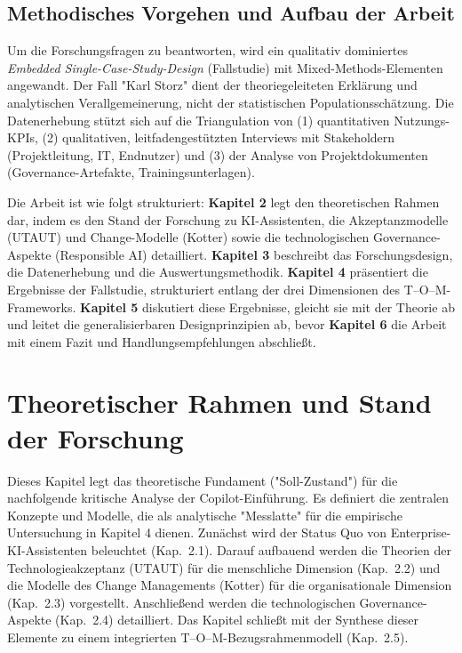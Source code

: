 \documentclass[12pt,a4paper,oneside]{article} %
\begin{document}
\subsection{Methodisches Vorgehen und Aufbau der Arbeit}
Um die Forschungsfragen zu beantworten, wird ein qualitativ dominiertes \textit{Embedded Single-Case-Study-Design} (Fallstudie) mit Mixed-Methods-Elementen angewandt. Der Fall "Karl Storz" dient der theoriegeleiteten Erklärung und analytischen Verallgemeinerung, nicht der statistischen Populationsschätzung. Die Datenerhebung stützt sich auf die Triangulation von (1) quantitativen Nutzungs-KPIs, (2) qualitativen, leitfadengestützten Interviews mit Stakeholdern (Projektleitung, IT, Endnutzer) und (3) der Analyse von Projektdokumenten (Governance-Artefakte, Trainingsunterlagen).

Die Arbeit ist wie folgt strukturiert: \textbf{Kapitel 2} legt den theoretischen Rahmen dar, indem es den Stand der Forschung zu KI-Assistenten, die Akzeptanzmodelle (UTAUT) und Change-Modelle (Kotter) sowie die technologischen Governance-Aspekte (Responsible AI) detailliert. \textbf{Kapitel 3} beschreibt das Forschungsdesign, die Datenerhebung und die Auswertungsmethodik. \textbf{Kapitel 4} präsentiert die Ergebnisse der Fallstudie, strukturiert entlang der drei Dimensionen des T–O–M-Frameworks. \textbf{Kapitel 5} diskutiert diese Ergebnisse, gleicht sie mit der Theorie ab und leitet die generalisierbaren Designprinzipien ab, bevor \textbf{Kapitel 6} die Arbeit mit einem Fazit und Handlungsempfehlungen abschließt.


\section{Theoretischer Rahmen und Stand der Forschung}

Dieses Kapitel legt das theoretische Fundament ("Soll-Zustand") für die nachfolgende kritische Analyse der Copilot-Einführung. Es definiert die zentralen Konzepte und Modelle, die als analytische "Messlatte" für die empirische Untersuchung in Kapitel 4 dienen. Zunächst wird der Status Quo von Enterprise-KI-Assistenten beleuchtet (Kap.~2.1). Darauf aufbauend werden die Theorien der Technologieakzeptanz (UTAUT) für die menschliche Dimension (Kap.~2.2) und die Modelle des Change Managements (Kotter) für die organisationale Dimension (Kap.~2.3) vorgestellt. Anschließend werden die technologischen Governance-Aspekte (Kap.~2.4) detailliert. Das Kapitel schließt mit der Synthese dieser Elemente zu einem integrierten T–O–M-Bezugsrahmenmodell (Kap.~2.5).
\end{document}
